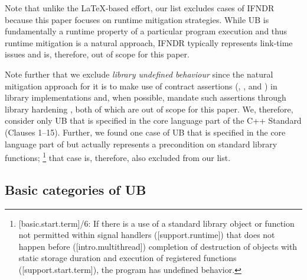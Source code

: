 Note that unlike the \LaTeX-based effort, our list excludes cases of IFNDR because this paper focuses on runtime mitigation strategies. While UB is fundamentally a runtime property of a particular program execution and thus runtime mitigation is a natural approach, IFNDR typically represents link-time issues and is, therefore, out of scope for this paper.

Note further that we exclude \emph{library undefined behaviour} since the natural mitigation approach for it is to make use of contract assertions (, , and ) in library implementations and, when possible, mandate such assertions through library hardening \cite{P3471R4}, both of which are out of scope for this paper. We, therefore, consider only UB that is specified in the core language part of the C++ Standard (Clauses 1--15). Further, we found one case of UB that is specified in the core language part of \cite{N5008} but actually represents a precondition on standard library functions; 
\footnote{[basic.start.term]/6: If there is a use of a standard library object or function not permitted within signal handlers ([support.runtime]) that does not happen before ([intro.multithread]) completion of destruction of objects with static storage duration and execution of  registered functions ([support.start.term]), the program has undefined behavior.}
that case is, therefore, also excluded from our list.

\subsection{Basic categories of UB}
\label{categories}

